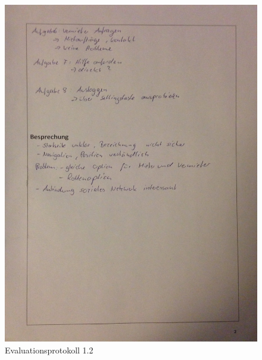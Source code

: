 \begin{figure}[H]
\includegraphics[width=1\textwidth]{./images/evaluation/eva12.JPG}
\caption{Evaluationsprotokoll 1.2}
\label{fig:evaluation12}
\end{figure}

